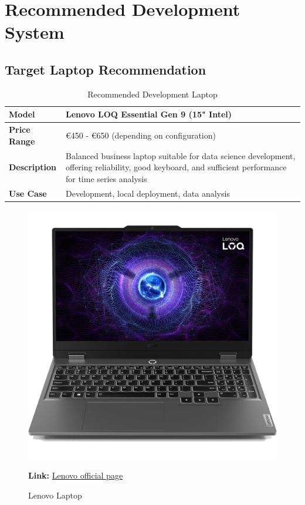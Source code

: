\section*{Recommended Development System}

\subsection*{Target Laptop Recommendation}

\begin{table}[H]
	\centering
	\caption{Recommended Development Laptop}
	\begin{tabular}{|p{3cm}|p{10cm}|}
		\hline
		\textbf{Model} & Lenovo LOQ Essential Gen 9 (15" Intel) \\
		\hline
		\textbf{Price Range} & €450 - €650 (depending on configuration) \\
		\hline
		\textbf{Description} & Balanced business laptop suitable for data science development, offering reliability, good keyboard, and sufficient performance for time series analysis \\
		\hline
		\textbf{Use Case} & Development, local deployment, data analysis \\
		\hline
	\end{tabular}
	\label{tab:laptop-recommendation} 
\end{table}
\begin{figure}[H]
	\centering
	\includegraphics[width=.7\textwidth]{Images/hadwareBOM/LenovoLaptop.png}
	\caption{Lenovo Laptop}
	\textbf{Link:} \href{https://www.lenovo.com/de/de/p/laptops/loq-laptops/lenovo-loq-essential-gen-9-15-intel/83lkcto1wwde1}{Lenovo official page}
\end{figure}

